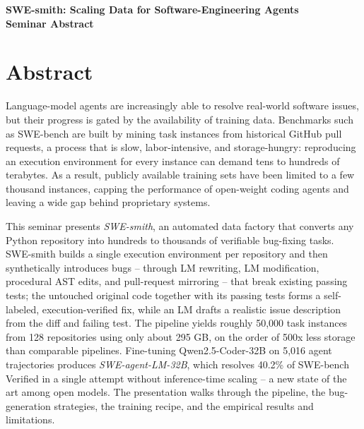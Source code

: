\documentclass[11pt]{article}
\begin{document}
\begin{center}
{\LARGE\bfseries SWE-smith: Scaling Data for Software-Engineering Agents}\\[1.1em]
{\large\bfseries Seminar Abstract}\\[0.6em]
{\normalsize \seminarDate}
\end{center}
\vspace{0.6em}
\section*{Abstract}
Language-model agents are increasingly able to resolve real-world software issues, but their progress is gated by the availability of training data. Benchmarks such as SWE-bench are built by mining task instances from historical GitHub pull requests, a process that is slow, labor-intensive, and storage-hungry: reproducing an execution environment for every instance can demand tens to hundreds of terabytes. As a result, publicly available training sets have been limited to a few thousand instances, capping the performance of open-weight coding agents and leaving a wide gap behind proprietary systems.

This seminar presents \emph{SWE-smith}, an automated data factory that converts any Python repository into hundreds to thousands of verifiable bug-fixing tasks. SWE-smith builds a single execution environment per repository and then synthetically introduces bugs -- through LM rewriting, LM modification, procedural AST edits, and pull-request mirroring -- that break existing passing tests; the untouched original code together with its passing tests forms a self-labeled, execution-verified fix, while an LM drafts a realistic issue description from the diff and failing test. The pipeline yields roughly 50{,}000 task instances from 128 repositories using only about 295 GB, on the order of 500x less storage than comparable pipelines. Fine-tuning Qwen2.5-Coder-32B on 5{,}016 agent trajectories produces \emph{SWE-agent-LM-32B}, which resolves 40.2\% of SWE-bench Verified in a single attempt without inference-time scaling -- a new state of the art among open models. The presentation walks through the pipeline, the bug-generation strategies, the training recipe, and the empirical results and limitations.
\end{document}
